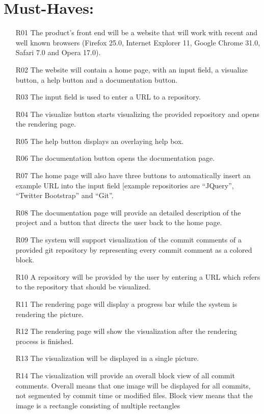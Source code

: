 \documentclass[12pt]{scrartcl}
\begin{document}
\section{Must-Haves:}
\begin{enumerate}
\item [R01] The product's front end will be a website that will work with recent and well known browsers (Firefox 25.0, Internet Explorer 11, Google Chrome 31.0, Safari 7.0 and Opera 17.0).
\item [R02] The website will contain a home page, with an input field, a visualize button, a help button and a documentation button.
\item [R03] The input field is used to enter a URL to a repository.
\item [R04] The visualize button starts visualizing the provided repository and opens the rendering page.
\item [R05] The help button displays an overlaying help box.
\item [R06] The documentation button opens the documentation page.
\item [R07] The home page will also have three buttons to automatically insert an example URL into the input field [example repositories are \enquote{JQuery}, \enquote{Twitter Bootstrap} and \enquote{Git}.
\item [R08] The documentation page will provide an detailed description of the project and a button that directs the user back to the home page.
\item [R09] The system will support visualization of the commit comments of a provided git repository by representing every commit comment as a colored block.
\item [R10] A repository will be provided by the user by entering a URL which refers to the repository that should be visualized.
\item [R11] The rendering page will display a progress bar while the system is rendering the picture.
\item [R12] The rendering page will show the visualization after the rendering process is finished.
\item [R13] The visualization will be displayed in a single picture.
\item [R14] The visualization will provide an overall block view of all commit
	comments. Overall means that one image will be displayed for all
	commits, not segmented by commit time or modified files. Block view means
	that the image is a rectangle consisting of multiple rectangles

\end{enumerate}
\end{document}
